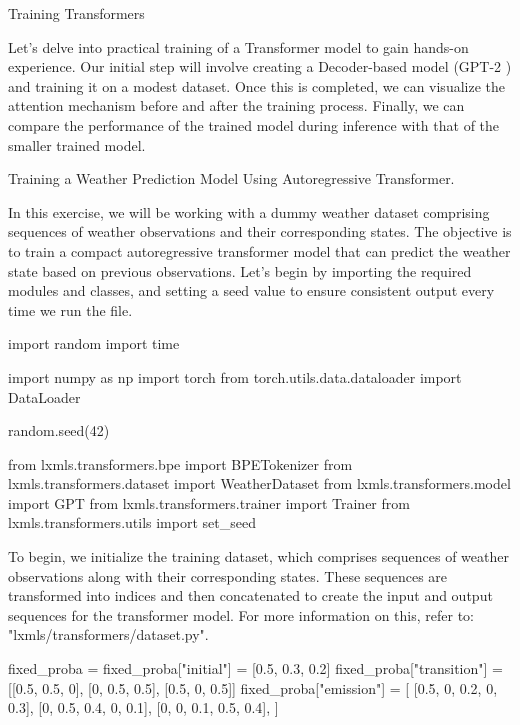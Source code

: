 \begin{exercise} Training Transformers

Let's delve into practical training of a Transformer model to gain hands-on experience. Our initial step will involve creating a Decoder-based model (GPT-2 \cite{gpt-2}) and training it on a modest dataset. Once this is completed, we can visualize the attention mechanism before and after the training process. Finally, we can compare the performance of the trained model during inference with that of the smaller trained model.


\begin{exercise} Training a Weather Prediction Model Using Autoregressive Transformer.

In this exercise, we will be working with a dummy weather dataset comprising sequences of weather observations and their corresponding states. The objective is to train a compact autoregressive transformer model that can predict the weather state based on previous observations.
Let's begin by importing the required modules and classes, and setting a seed value to ensure consistent output every time we run the file.

\begin{python}
import random
import time

import numpy as np
import torch
from torch.utils.data.dataloader import DataLoader

random.seed(42)

from lxmls.transformers.bpe import BPETokenizer
from lxmls.transformers.dataset import WeatherDataset
from lxmls.transformers.model import GPT
from lxmls.transformers.trainer import Trainer
from lxmls.transformers.utils import set_seed
\end{python}

\end{exercise}

To begin, we initialize the training dataset, which comprises sequences of weather observations along with their corresponding states. These sequences are transformed into indices and then concatenated to create the input and output sequences for the transformer model. For more information on this, refer to: "lxmls/transformers/dataset.py".

\begin{python}
fixed_proba = {}
fixed_proba["initial"] = [0.5, 0.3, 0.2]
fixed_proba["transition"] = [[0.5, 0.5, 0], [0, 0.5, 0.5], [0.5, 0, 0.5]]
fixed_proba["emission"] = [
    [0.5, 0, 0.2, 0, 0.3],
    [0, 0.5, 0.4, 0, 0.1],
    [0, 0, 0.1, 0.5, 0.4],
]


\end{python}
\end{exercise}
